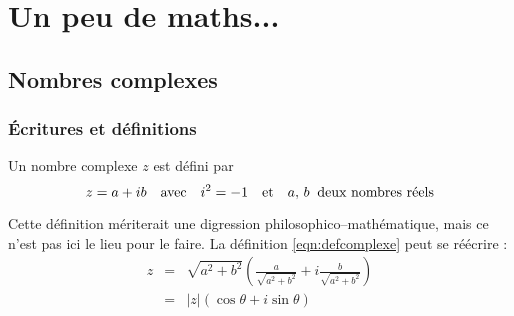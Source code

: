 \chapter{Un peu de maths...}
\label{chap:maths}

\section{Nombres complexes}
\subsection{Écritures et définitions}
Un nombre complexe $z$ est défini par
\begin{equation}
\label{eqn:defcomplexe}
z = a + ib \quad \mbox{avec} \quad i^2 = -1 \quad \mbox{et} \quad a,\,b 
\;\;\mbox{deux nombres réels}
\end{equation}

Cette définition mériterait une digression
philosophico--mathématique, mais ce n'est pas ici le lieu pour le faire.
La définition \ref{eqn:defcomplexe} peut se réécrire :
\begin{eqnarray}
z & = & \sqrt{a^2+b^2}
\left( \frac{a}{\sqrt{a^2+b^2}} + i\frac{b}{\sqrt{a^2+b^2}} \right) \nonumber\\
\label{eqn:zexpcomplexe}
& = & |z| \left( \cos\theta + i\sin\theta \right)
\end{eqnarray}

